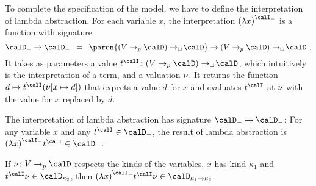 \documentclass[../../diss.tex]{subfiles}
\begin{document}
To complete the specification of the model, we have to define the interpretation of lambda abstraction.
For each variable $x$, the interpretation ${(\lambda x)}^\interpretationt$ is a function with signature
\[
    \domaint \to \domaint
    \enspace = \enspace
    \paren{(V \pto \domain) \cto \domain} \to (V \pto \domain) \cto \domain
    \ .
\]
It takes as parameters a value $t^\interpretation \colon (V \pto \domain) \cto \domain$, which intuitively is the interpretation of a term, and a valuation $\nu$.
It returns the function $d \mapsto t^\interpretation (\val[x \mapsto d])$ that expects a value $d$ for $x$ and evaluates $t^\interpretation$ at $\nu$ with the value for $x$ replaced by $d$.

\begin{lemma}
    The interpretation of lambda abstraction has signature $\domaint \to \domaint$:
    For any variable $x$ and any $t^\interpretation \in \domaint$, the result of lambda abstraction is ${(\lambda x)}^\interpretationt t^\interpretation \in \domaint$.

    If $\val \colon V \pto \domain$ respects the kinds of the variables, $x$ has kind $\kappa_1$ and $t^\interpretation \val \in \domain{\kappa_2}$, then ${(\lambda x)}^\interpretationt t^\interpretation \val \in \domain{\kappa_1 \to \kappa_2}$.
\end{lemma}
\end{document}
